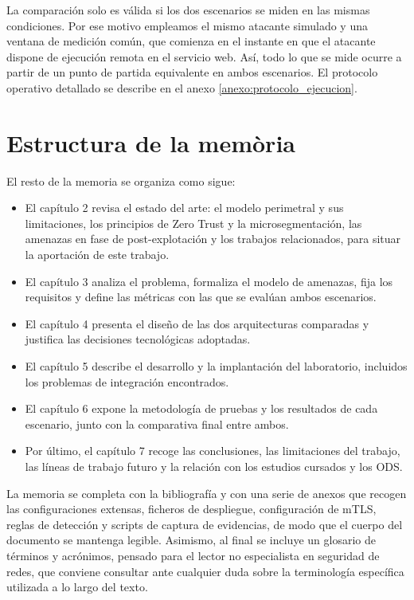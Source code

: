 \documentclass[11pt,spanish,listoffigures,listoftables]{tfgetsinf}
\begin{document}
    La comparación solo es válida si los dos escenarios se miden en las mismas condiciones. Por ese motivo empleamos el mismo atacante simulado y una ventana de medición común, que comienza en el instante en que el atacante dispone de ejecución remota en el servicio web. Así, todo lo que se mide ocurre a partir de un punto de partida equivalente en ambos escenarios. El protocolo operativo detallado se describe en el anexo \ref{anexo:protocolo_ejecucion}.  
    
    \section{Estructura de la mem\`oria}
    El resto de la memoria se organiza como sigue:
    \begin{itemize}
        \item El capítulo 2 revisa el estado del arte: el modelo perimetral y sus limitaciones, los principios de Zero Trust y la microsegmentación, las amenazas en fase de post-explotación y los trabajos relacionados, para situar la aportación de este trabajo.
        \item El capítulo 3 analiza el problema, formaliza el modelo de amenazas, fija los requisitos y define las métricas con las que se evalúan ambos escenarios.
        \item El capítulo 4 presenta el diseño de las dos arquitecturas comparadas y justifica las decisiones tecnológicas adoptadas.
        \item El capítulo 5 describe el desarrollo y la implantación del laboratorio, incluidos los problemas de integración encontrados.
        \item El capítulo 6 expone la metodología de pruebas y los resultados de cada escenario, junto con la comparativa final entre ambos.
        \item Por último, el capítulo 7 recoge las conclusiones, las limitaciones del trabajo, las líneas de trabajo futuro y la relación con los estudios cursados y los ODS.
    \end{itemize}

    La memoria se completa con la bibliografía y con una serie de anexos que recogen las configuraciones extensas, ficheros de despliegue, configuración de mTLS, reglas de detección y scripts de captura de evidencias, de modo que el cuerpo del documento se mantenga legible. Asimismo, al final se incluye un glosario de términos y acrónimos, pensado para el lector no especialista en seguridad de redes, que conviene consultar ante cualquier duda sobre la terminología específica utilizada a lo largo del texto.
\end{document}
